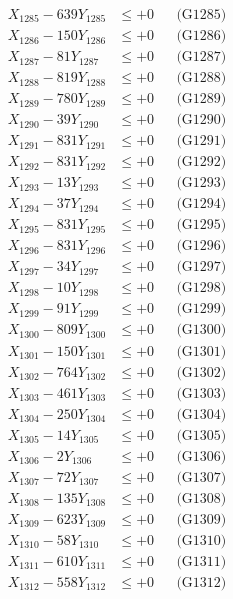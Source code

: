 \documentclass[a4paper,10pt]{article}
\begin{document}
{\begin{align}
X_{1285} - 639Y_{1285} &\leq +0 && \text{(G1285)} \\
X_{1286} - 150Y_{1286} &\leq +0 && \text{(G1286)} \\
X_{1287} - 81Y_{1287} &\leq +0 && \text{(G1287)} \\
X_{1288} - 819Y_{1288} &\leq +0 && \text{(G1288)} \\
X_{1289} - 780Y_{1289} &\leq +0 && \text{(G1289)} \\
X_{1290} - 39Y_{1290} &\leq +0 && \text{(G1290)} \\
\allowbreak
X_{1291} - 831Y_{1291} &\leq +0 && \text{(G1291)} \\
X_{1292} - 831Y_{1292} &\leq +0 && \text{(G1292)} \\
X_{1293} - 13Y_{1293} &\leq +0 && \text{(G1293)} \\
X_{1294} - 37Y_{1294} &\leq +0 && \text{(G1294)} \\
X_{1295} - 831Y_{1295} &\leq +0 && \text{(G1295)} \\
X_{1296} - 831Y_{1296} &\leq +0 && \text{(G1296)} \\
X_{1297} - 34Y_{1297} &\leq +0 && \text{(G1297)} \\
X_{1298} - 10Y_{1298} &\leq +0 && \text{(G1298)} \\
X_{1299} - 91Y_{1299} &\leq +0 && \text{(G1299)} \\
X_{1300} - 809Y_{1300} &\leq +0 && \text{(G1300)} \\
\allowbreak
X_{1301} - 150Y_{1301} &\leq +0 && \text{(G1301)} \\
X_{1302} - 764Y_{1302} &\leq +0 && \text{(G1302)} \\
X_{1303} - 461Y_{1303} &\leq +0 && \text{(G1303)} \\
X_{1304} - 250Y_{1304} &\leq +0 && \text{(G1304)} \\
X_{1305} - 14Y_{1305} &\leq +0 && \text{(G1305)} \\
X_{1306} - 2Y_{1306} &\leq +0 && \text{(G1306)} \\
X_{1307} - 72Y_{1307} &\leq +0 && \text{(G1307)} \\
X_{1308} - 135Y_{1308} &\leq +0 && \text{(G1308)} \\
X_{1309} - 623Y_{1309} &\leq +0 && \text{(G1309)} \\
X_{1310} - 58Y_{1310} &\leq +0 && \text{(G1310)} \\
\allowbreak
X_{1311} - 610Y_{1311} &\leq +0 && \text{(G1311)} \\
X_{1312} - 558Y_{1312} &\leq +0 && \text{(G1312)} \\

\end{align}}
\end{document}
